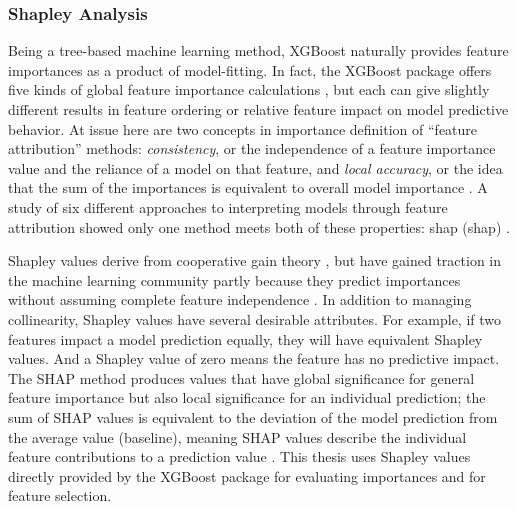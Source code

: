 \subsubsection{Shapley Analysis}\label{ch3:xgb_shapley}
Being a tree-based machine learning method, XGBoost naturally provides feature importances as a product of model-fitting. In fact, the XGBoost package offers five kinds of global feature importance calculations \citep{xgboost_developers_xgboost_2020}, but each can give slightly different results in feature ordering or relative feature impact on model predictive behavior. At issue here are two concepts in importance definition of ``feature attribution'' methods: \textit{consistency}, or the independence of a feature importance value and the reliance of a model on that feature, and \textit{local accuracy}, or the idea that the sum of the importances is equivalent to overall model importance \citep{lundberg_interpretable_2020}. A study of six different approaches to interpreting models through feature attribution showed only one method meets both of these properties: \acrlong{shap} (\acrshort{shap}) \citep{lundberg_consistent_2019}.

Shapley values derive from cooperative gain theory \citep{shapley_value_1997}, but have gained traction in the machine learning community partly because they predict importances without assuming complete feature independence \citep{lundberg_unified_2017}. In addition to managing collinearity, Shapley values have several desirable attributes. For example, if two features impact a model prediction equally, they will have equivalent Shapley values. And a Shapley value of zero means the feature has no predictive impact. The SHAP method produces values that have global significance for general feature importance but also local significance for an individual prediction; the sum of SHAP values is equivalent to the deviation of the model prediction from the average value (baseline), meaning SHAP values describe the individual feature contributions to a prediction value \citep{lundberg_unified_2017}. This thesis uses Shapley values directly provided by the XGBoost package \citep{xgboost_developers_xgboost_2020} for evaluating importances and for feature selection.

